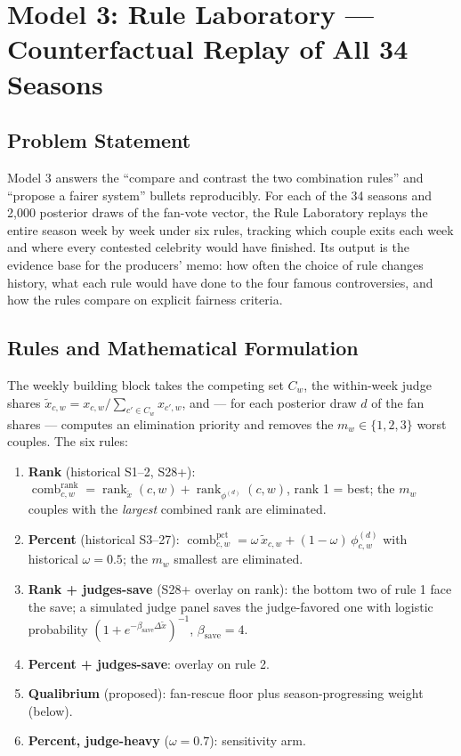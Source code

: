 \section{Model 3: Rule Laboratory --- Counterfactual Replay of All 34 Seasons}
\label{sec:model3}

\subsection{Problem Statement}

Model 3 answers the ``compare and contrast the two combination rules'' and
``propose a fairer system'' bullets reproducibly. For each of the 34 seasons and
2{,}000 posterior draws of the fan-vote vector, the Rule Laboratory replays the
entire season week by week under six rules, tracking which couple exits each week
and where every contested celebrity would have finished. Its output is the
evidence base for the producers' memo: how often the choice of rule changes
history, what each rule would have done to the four famous controversies, and how
the rules compare on explicit fairness criteria.

\subsection{Rules and Mathematical Formulation}

The weekly building block takes the competing set $C_w$, the within-week judge
shares $\tilde x_{c,w} = x_{c,w}\big/\sum_{c'\in C_w} x_{c',w}$, and --- for each
posterior draw $d$ of the fan shares --- computes an elimination priority and
removes the $m_w \in \{1,2,3\}$ worst couples. The six rules:

\begin{enumerate}[leftmargin=2em]
\item \textbf{Rank} (historical S1--2, S28+):
$\operatorname{comb}^{\text{rank}}_{c,w} = \operatorname{rank}_{\tilde x}(c,w) +
\operatorname{rank}_{\phi^{(d)}}(c,w)$, rank 1 = best; the $m_w$ couples with the
\emph{largest} combined rank are eliminated.
\item \textbf{Percent} (historical S3--27):
$\operatorname{comb}^{\text{pct}}_{c,w} = \omega\,\tilde x_{c,w} + (1-\omega)\,
\phi^{(d)}_{c,w}$ with historical $\omega = 0.5$; the $m_w$ smallest are eliminated.
\item \textbf{Rank + judges-save} (S28+ overlay on rank): the bottom two of rule 1
face the save; a simulated judge panel saves the judge-favored one with logistic
probability $(1+e^{-\beta_{\text{save}}\Delta \tilde x})^{-1}$,
$\beta_{\text{save}} = 4$.
\item \textbf{Percent + judges-save}: overlay on rule 2.
\item \textbf{Qualibrium} (proposed): fan-rescue floor plus season-progressing
weight (below).
\item \textbf{Percent, judge-heavy} ($\omega = 0.7$): sensitivity arm.
\end{enumerate}

